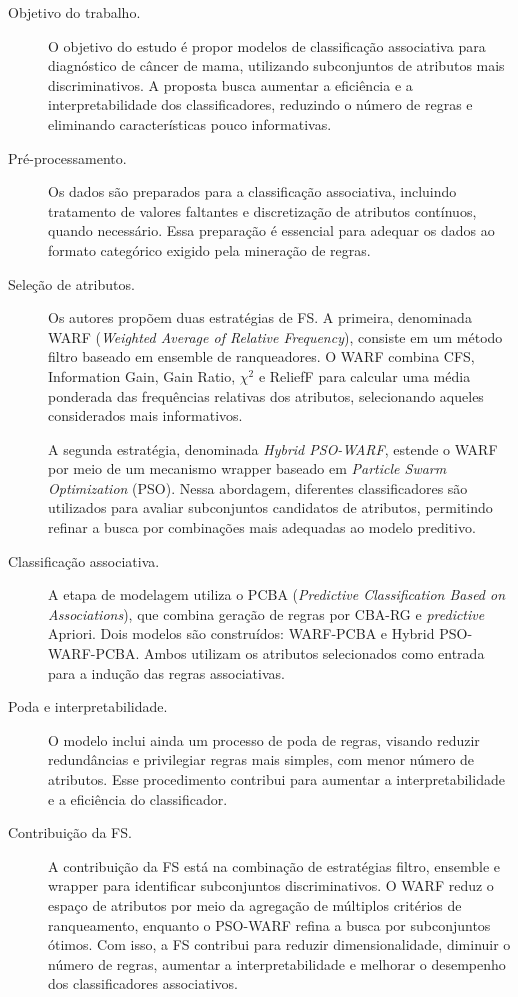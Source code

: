\begin{description}
    \item[Objetivo do trabalho.] O objetivo do estudo é propor modelos de classificação associativa para diagnóstico de câncer de mama, utilizando subconjuntos de atributos mais discriminativos. A proposta busca aumentar a eficiência e a interpretabilidade dos classificadores, reduzindo o número de regras e eliminando características pouco informativas.

    \item[Pré-processamento.] Os dados são preparados para a classificação associativa, incluindo tratamento de valores faltantes e discretização de atributos contínuos, quando necessário. Essa preparação é essencial para adequar os dados ao formato categórico exigido pela mineração de regras.

    \item[Seleção de atributos.] Os autores propõem duas estratégias de FS. A primeira, denominada WARF (\textit{Weighted Average of Relative Frequency}), consiste em um método filtro baseado em ensemble de ranqueadores. O WARF combina CFS, Information Gain, Gain Ratio, $\chi^2$ e ReliefF para calcular uma média ponderada das frequências relativas dos atributos, selecionando aqueles considerados mais informativos.

    A segunda estratégia, denominada \textit{Hybrid PSO-WARF}, estende o WARF por meio de um mecanismo wrapper baseado em \textit{Particle Swarm Optimization} (PSO). Nessa abordagem, diferentes classificadores são utilizados para avaliar subconjuntos candidatos de atributos, permitindo refinar a busca por combinações mais adequadas ao modelo preditivo.

    \item[Classificação associativa.] A etapa de modelagem utiliza o PCBA (\textit{Predictive Classification Based on Associations}), que combina geração de regras por CBA-RG e \textit{predictive} Apriori. Dois modelos são construídos: WARF-PCBA e Hybrid PSO-WARF-PCBA. Ambos utilizam os atributos selecionados como entrada para a indução das regras associativas.

    \item[Poda e interpretabilidade.] O modelo inclui ainda um processo de poda de regras, visando reduzir redundâncias e privilegiar regras mais simples, com menor número de atributos. Esse procedimento contribui para aumentar a interpretabilidade e a eficiência do classificador.

    \item[Contribuição da FS.] A contribuição da FS está na combinação de estratégias filtro, ensemble e wrapper para identificar subconjuntos discriminativos. O WARF reduz o espaço de atributos por meio da agregação de múltiplos critérios de ranqueamento, enquanto o PSO-WARF refina a busca por subconjuntos ótimos. Com isso, a FS contribui para reduzir dimensionalidade, diminuir o número de regras, aumentar a interpretabilidade e melhorar o desempenho dos classificadores associativos.


\end{description}
